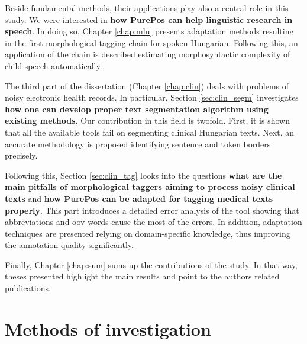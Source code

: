 Beside fundamental methods, their applications play also a central role in this study.
We were interested in \textbf{how PurePos can help linguistic research in speech}.
In doing so, Chapter \ref{chap:mlu} presents adaptation methods resulting in the first morphological tagging chain for spoken Hungarian.
Following this, an application of the chain is described estimating morphosyntactic complexity of child speech automatically.

The third part of the dissertation (Chapter \ref{chap:clin}) deals with problems of noisy electronic health records.
In particular, Section \ref{sec:clin_segm} investigates \textbf{how one can develop proper text segmentation algorithm using existing methods}. 
Our contribution in this field is twofold. 
First, it is shown that all the available tools fail on segmenting clinical Hungarian texts.
Next, an accurate methodology is proposed identifying sentence and token borders precisely.

Following this, Section \ref{sec:clin_tag} looks into the questions \textbf{what are the main pitfalls of morphological taggers aiming to process noisy clinical texts} and \textbf{how PurePos can be adapted for tagging medical texts properly}.
This part introduces a detailed error analysis of the tool showing that abbreviations and \gls{oov} words cause the most of the errors.
In addition, adaptation techniques are presented relying on domain-specific knowledge, thus improving the annotation quality significantly.

Finally, Chapter \ref{chap:sum} sums up the contributions of the study. 
In that way, theses presented highlight the main results and point to the authors related publications.


\section{Methods of investigation}

